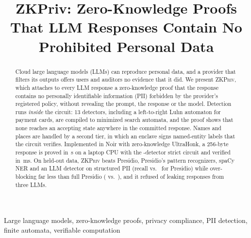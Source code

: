 \documentclass[conference]{IEEEtran}
\newcommand{\sys}{\textsc{ZKPriv}}
\begin{document}
\title{ZKPriv: Zero-Knowledge Proofs That LLM Responses Contain No Prohibited Personal Data}

\author{%
}

\maketitle

\begin{abstract}
Cloud large language models (LLMs) can reproduce personal data, and a provider that filters its outputs offers users and auditors no evidence that it did. We present \sys{}, which attaches to every LLM response a zero-knowledge proof that the response contains no personally identifiable information (PII) forbidden by the provider's registered policy, without revealing the prompt, the response or the model. Detection runs \emph{inside} the circuit: 13 detectors, including a left-to-right Luhn automaton for payment cards, are compiled to minimized search automata, and the proof shows that none reaches an accepting state anywhere in the committed response. Names and places are handled by a second tier, in which an enclave signs named-entity labels that the circuit verifies. Implemented in Noir with zero-knowledge UltraHonk, a 256-byte response is proved in \strictProve{}\,s on a laptop CPU with the \strictDets{}-detector strict circuit and verified in \strictVerify{}\,ms. On held-out data, \sys{} beats Presidio, Presidio's pattern recognizers, spaCy NER and an LLM detector on structured PII (recall \tAiStrictStruct{} vs.\ \tAiPresStruct{} for Presidio) while over-blocking far less than full Presidio (\tAiStrictOver{} vs.\ \tAiPresOver{}), and it refused \mTotRef{} of \mTotPii{} leaking responses from three LLMs.
\end{abstract}

\begin{IEEEkeywords}
Large language models, zero-knowledge proofs, privacy compliance, PII detection, finite automata, verifiable computation
\end{IEEEkeywords}
\end{document}
